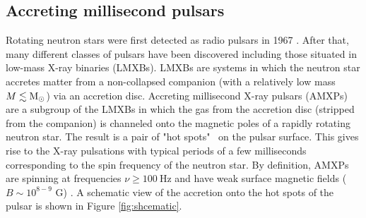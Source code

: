 \documentclass{wihuri}
\def\msun{{\rm M_{\odot}}}
\begin{document}
 



\subsection{Accreting millisecond pulsars}






Rotating neutron stars were first detected as radio pulsars in 1967 \cite{gold68}. %
After that, many different classes of pulsars have been discovered including those situated in low-mass X-ray binaries (LMXBs). LMXBs are systems in which the neutron star accretes matter from a non-collapsed companion (with a relatively low mass $M \lesssim \msun$) via an accretion disc. Accreting millisecond X-ray pulsars (AMXPs) are a subgroup of the LMXBs in which the gas from the accretion disc (stripped from the companion) is channeled onto the magnetic poles of a rapidly rotating neutron star. The result is a pair of "hot spots" \ on the pulsar surface.  This gives rise to the X-ray pulsations with typical periods of a few milliseconds corresponding to the spin frequency of the neutron star. By definition, AMXPs are spinning at frequencies $\nu \ge 100 ~\mathrm{Hz}$ and have weak surface magnetic fields ($B \sim 10^{8-9}$ G) \cite{patruno}. A schematic view of the accretion onto the hot spots of the pulsar is shown in Figure \ref{fig:shcematic}.
\end{document}
